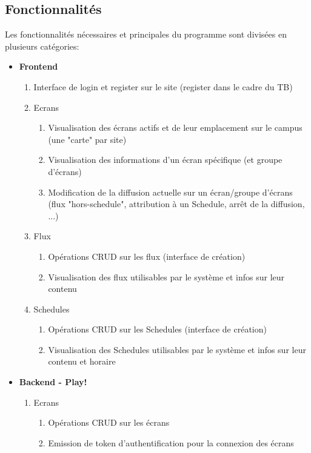 \documentclass[french]{article}
\begin{document}
\subsection{Fonctionnalités}
Les fonctionnalités nécessaires et principales du programme sont divisées en plusieurs catégories:
\begin{itemize}
	\item \textbf{Frontend}
	\begin{enumerate}
		\item Interface de login et register sur le site (register dans le cadre du TB)
		\item Ecrans
		\begin{enumerate}
			\item Visualisation des écrans actifs et de leur emplacement sur le campus (une "carte" par site)
			\item Visualisation des informations d'un écran spécifique (et groupe d'écrans)
			\item Modification de la diffusion actuelle sur un écran/groupe d'écrans (flux "hors-schedule", attribution à un Schedule, arrêt de la diffusion, ...)
		\end{enumerate}
		\item Flux
		\begin{enumerate}
			\item Opérations CRUD sur les flux (interface de création)
			\item Visualisation des flux utilisables par le système et infos sur leur contenu
		\end{enumerate}
		\item Schedules
		\begin{enumerate}
			\item Opérations CRUD sur les Schedules (interface de création)
			\item Visualisation des Schedules utilisables par le système et infos sur leur contenu et horaire
		\end{enumerate}
		\end{enumerate}
	\item \textbf{Backend - Play!}
	\begin{enumerate}
		\item Ecrans
		\begin{enumerate}
			\item Opérations CRUD sur les écrans
			\item Emission de token d'authentification pour la connexion des écrans
		\end{enumerate}

\end{enumerate}
\end{itemize}
\end{document}
